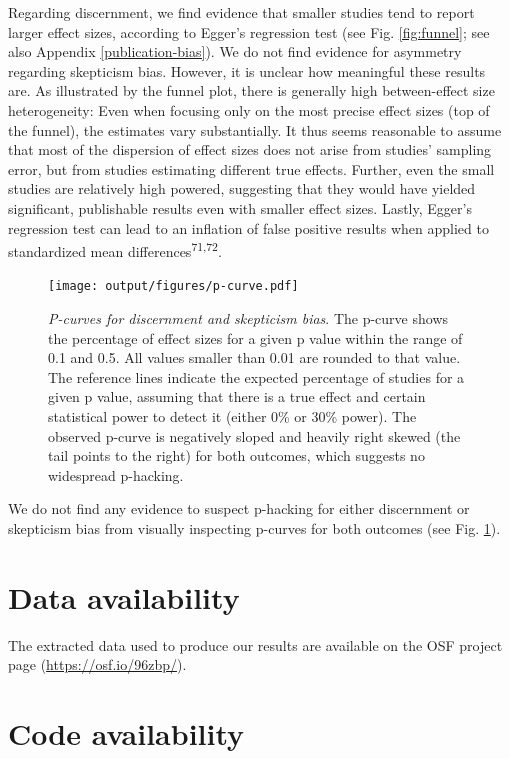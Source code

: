 \documentclass[
  doc,floatsintext]{apa6}
\begin{document}
Regarding discernment, we find evidence that smaller studies tend to report larger effect sizes, according to Egger's regression test (see Fig. \ref{fig:funnel}; see also Appendix \ref{publication-bias}). We do not find evidence for asymmetry regarding skepticism bias. However, it is unclear how meaningful these results are. As illustrated by the funnel plot, there is generally high between-effect size heterogeneity: Even when focusing only on the most precise effect sizes (top of the funnel), the estimates vary substantially. It thus seems reasonable to assume that most of the dispersion of effect sizes does not arise from studies' sampling error, but from studies estimating different true effects. Further, even the small studies are relatively high powered, suggesting that they would have yielded significant, publishable results even with smaller effect sizes. Lastly, Egger's regression test can lead to an inflation of false positive results when applied to standardized mean differences\textsuperscript{71,72}.



\begin{figure}
\centering
\texttt{[image: output/figures/p-curve.pdf]}
\caption{\label{fig:p-curve}\emph{P-curves for discernment and skepticism bias}. The p-curve shows the percentage of effect sizes for a given p value within the range of 0.1 and 0.5. All values smaller than 0.01 are rounded to that value. The reference lines indicate the expected percentage of studies for a given p value, assuming that there is a true effect and certain statistical power to detect it (either 0\% or 30\% power). The observed p-curve is negatively sloped and heavily right skewed (the tail points to the right) for both outcomes, which suggests no widespread p-hacking.}
\end{figure}

We do not find any evidence to suspect p-hacking for either discernment or skepticism bias from visually inspecting p-curves for both outcomes (see Fig. \ref{fig:p-curve}).

\section{Data availability}\label{data-availability}

The extracted data used to produce our results are available on the OSF project page (\url{https://osf.io/96zbp/}).

\section{Code availability}\label{code-availability}
\end{document}
